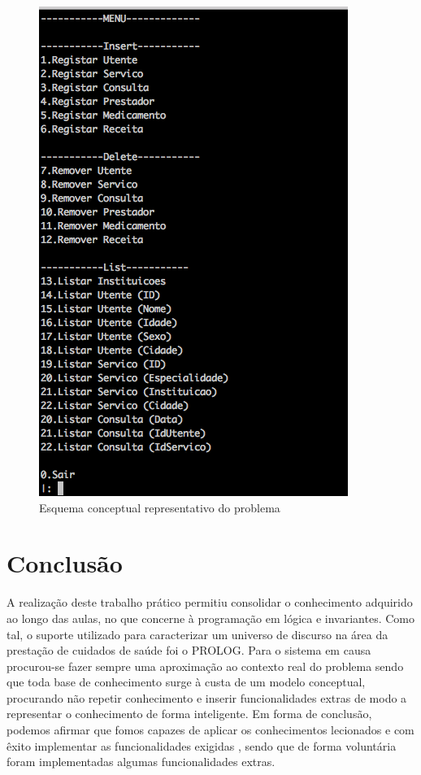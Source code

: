 \documentclass[25pt]{article}
\begin{document}
 \begin{figure}[H]
 \centering\includegraphics[scale=0.45]{menu}
 \caption{\label{fig:controller}Esquema conceptual representativo do problema}
 \end{figure}
\newpage

\section{Conclusão}
A realização deste trabalho prático permitiu consolidar o conhecimento adquirido ao longo das aulas, no que concerne
à programação em lógica e invariantes. Como tal, o suporte utilizado para caracterizar um universo de discurso na área da prestação de cuidados de
saúde foi o PROLOG.
Para o sistema em causa procurou-se fazer sempre uma aproximação ao contexto real do problema sendo que toda  base de conhecimento surge à custa de um
modelo conceptual, procurando não repetir conhecimento e inserir funcionalidades extras de modo a representar o conhecimento de forma inteligente.
Em forma de conclusão, podemos afirmar que fomos capazes de aplicar os conhecimentos lecionados e com êxito implementar as funcionalidades exigidas , sendo que de forma voluntária foram implementadas algumas funcionalidades extras.
\newpage
\end{document}

